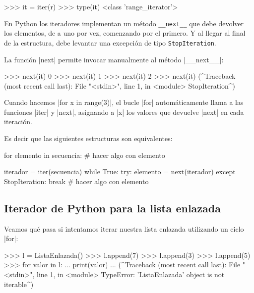 \begin{codigo-python-sn}
>>> it = iter(r)
>>> type(it)
<class 'range_iterator'>
\end{codigo-python-sn}

En Python los iteradores implementan un método
\lstinline!__next__! que debe devolver los elementos, de a uno por vez,
comenzando por el primero.  Y al llegar al final de la estructura, debe
levantar una excepción de tipo \lstinline!StopIteration!.

La función |next| permite invocar manualmente al método |__next__|:

\begin{codigo-python-sn}
>>> next(it)
0
>>> next(it)
1
>>> next(it)
2
>>> next(it)
(^Traceback (most recent call last):
  File "<stdin>", line 1, in <module>
StopIteration^)
\end{codigo-python-sn}

Cuando hacemos |for x in range(3)|, el bucle |for| automáticamente llama a las
funciones |iter| y |next|, asignando a |x| los valores que devuelve |next| en
cada iteración.

Es decir que las siguientes estructuras son equivalentes:

\noindent\begin{minipage}{.45\textwidth}
\begin{codigo-python-sn}
for elemento in secuencia:
	# hacer algo con elemento
\end{codigo-python-sn}
\end{minipage}\hfill%
\begin{minipage}{.45\textwidth}
\begin{codigo-python-sn}
iterador = iter(secuencia)
while True:
    try:
        elemento = next(iterador)
    except StopIteration:
        break
    # hacer algo con elemento
\end{codigo-python-sn}
\end{minipage}

\subsection{Iterador de Python para la lista enlazada}

Veamos qué pasa si intentamos iterar nuestra lista enlazada utilizando un ciclo
|for|:

\begin{codigo-python-sn}
>>> l = ListaEnlazada()
>>> l.append(7)
>>> l.append(3)
>>> l.append(5)
>>> for valor in l:
...    print(valor)
...
(^Traceback (most recent call last):
  File "<stdin>", line 1, in <module>
TypeError: 'ListaEnlazada' object is not iterable^)
\end{codigo-python-sn}


